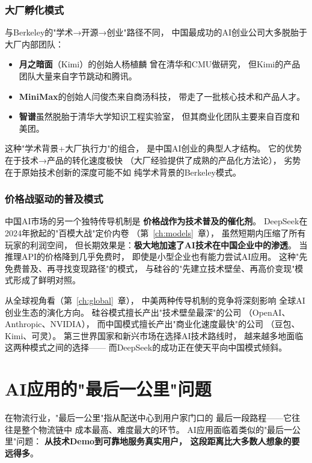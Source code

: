 \subsubsection{大厂孵化模式}
与Berkeley的"学术→开源→创业"路径不同，
中国最成功的AI创业公司大多脱胎于大厂内部团队：
\begin{itemize}
  \item \textbf{月之暗面}（Kimi）的创始人杨植麟
    曾在清华和CMU做研究，
    但Kimi的产品团队大量来自字节跳动和腾讯。
  \item \textbf{MiniMax}的创始人闫俊杰来自商汤科技，
    带走了一批核心技术和产品人才。
  \item \textbf{智谱}虽然脱胎于清华大学知识工程实验室，
    但其商业化团队主要来自百度和美团。
\end{itemize}

这种"学术背景+大厂执行力"的组合，
是中国AI创业的典型人才结构。
它的优势在于技术→产品的转化速度极快
（大厂经验提供了成熟的产品化方法论），
劣势在于原始技术创新的深度可能不如
纯学术背景的Berkeley模式。

\subsubsection{价格战驱动的普及模式}
中国AI市场的另一个独特传导机制是
\textbf{价格战作为技术普及的催化剂}。
DeepSeek在2024年掀起的"百模大战"定价内卷
（第~\ref{ch:models}~章），
虽然短期内压缩了所有玩家的利润空间，
但长期效果是：\textbf{极大地加速了AI技术在中国企业中的渗透}。
当推理API的价格降到几乎免费时，
即使是小型企业也有能力尝试AI应用。
这种"先免费普及、再寻找变现路径"的模式，
与硅谷的"先建立技术壁垒、再高价变现"模式形成了鲜明对照。

从全球视角看（第~\ref{ch:global}~章），
中美两种传导机制的竞争将深刻影响
全球AI创业生态的演化方向。
硅谷模式擅长产出"技术壁垒最深"的公司
（OpenAI、Anthropic、NVIDIA），
而中国模式擅长产出"商业化速度最快"的公司
（豆包、Kimi、可灵）。
第三世界国家和新兴市场在选择AI技术路线时，
越来越多地面临这两种模式之间的选择——
而DeepSeek的成功正在使天平向中国模式倾斜。


\section{AI应用的"最后一公里"问题}
\label{sec:patterns-last-mile}

在物流行业，"最后一公里"指从配送中心到用户家门口的
最后一段路程——它往往是整个物流链中
成本最高、难度最大的环节。
AI应用面临着类似的"最后一公里"问题：
\textbf{从技术Demo到可靠地服务真实用户，
这段距离比大多数人想象的要远得多}。

